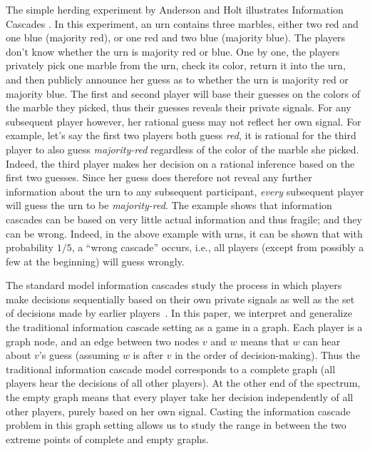 \documentclass[a4paper,UKenglish]{lipics}
\theoremstyle{definition}
\begin{document}
The simple herding experiment by Anderson and Holt illustrates Information Cascades \cite{anderson1996classroom, anderson1997information}. 
In this experiment, an urn contains three marbles, 
	either two red and one blue (majority red), 
	or one red and two blue (majority blue). 
The players don't know whether the urn is majority red or blue. 
One by one, the players privately pick one marble from the urn, 
	check its color, return it into the urn, 
	and then publicly announce her guess as to whether the urn is majority red or majority blue. 
The first and second player will base their guesses on the colors of the marble they picked, 
	thus their guesses reveals their private signals. 
For any subsequent player however, 
	her rational guess may not reflect her own signal. 
For example, let's say the first two players both guess \emph{red}, 
	it is rational for the third player to also guess \emph{majority-red} regardless of the color of the marble she picked. 
Indeed, the third player makes her decision on a rational inference based on the first two guesses. 
Since her guess does therefore not reveal any further information about the urn to any subsequent participant, 
	\emph{every} subsequent player will guess the urn to be \emph{majority-red}. 
The example shows that information cascades can be based on very little actual information and thus fragile; 
	and they can be wrong. 
Indeed, in the above example with urns, 
	it can be shown that with probability $1/5$, a ``wrong cascade'' occurs, 
	i.e., all players (except from possibly a few at the beginning) will guess wrongly.  

The standard model information cascades study the process in which 
	players make decisions sequentially based on their own private signals 
	as well as the set of decisions made by earlier players~\cite{banerjee1992simple, bikhchandani1992theory, welch1992sequential}. 
In this paper, we interpret and generalize the traditional information cascade setting as a game in a graph. 
Each player is a graph node, 
	and an edge between two nodes $v$ and $w$ means that $w$ can hear about $v$'s guess 
	(assuming $w$ is after $v$ in the order of decision-making). 
Thus the traditional information cascade model corresponds to a complete graph 
	(all players hear the decisions of all other players). 
At the other end of the spectrum, 
	the empty graph means that every player take her decision independently of all other players, 
	purely based on her own signal.
Casting the information cascade problem in this graph setting 
	allows us to study the range in between the two extreme points of complete and empty graphs. 
\end{document}
